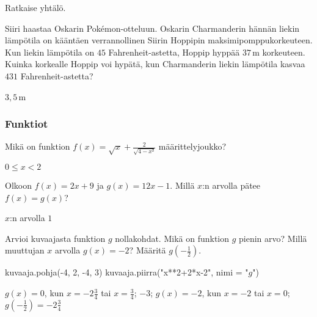 \begin{tehtava}
	Ratkaise yhtälö.
	
\begin{vastaus}
\end{vastaus}
\end{tehtava}

\begin{tehtava}
	Siiri haastaa Oskarin Pokémon-otteluun. Oskarin Charmanderin hännän liekin lämpötila on kääntäen verrannollinen Siirin Hoppipin maksimipomppukorkeuteen. Kun liekin lämpötila on $45$ Fahrenheit-astetta, Hoppip hyppää $37$\,m korkeuteen. Kuinka korkealle Hoppip voi hypätä, kun Charmanderin liekin lämpötila kasvaa $431$ Fahrenheit-astetta? %
	

\begin{vastaus}
	$3,5$\,m
\end{vastaus}
\end{tehtava}

\subsubsection*{Funktiot}

\begin{tehtava}
	Mikä on funktion $f(x)=\sqrt{x}+\frac{2}{\sqrt{4-x²}}$ määrittelyjoukko?
\begin{vastaus}
	{$0\leq x<2$}
		
\end{vastaus}
\end{tehtava}

\begin{tehtava}
	Olkoon $f(x)=2x+9$ ja $g(x)=12x-1$. Millä $x$:n arvolla pätee $f(x)=g(x)$? 

\begin{vastaus}
$x$:n arvolla $1$
		
\end{vastaus}
\end{tehtava}

\begin{tehtava}
Arvioi kuvaajasta funktion $g$ nollakohdat. Mikä on funktion $g$ pienin arvo? Millä muuttujan $x$ arvolla $g(x)=-2$? Määritä $g\left(-\frac{1}{2}\right)$.
\begin{kuva}
    kuvaaja.pohja(-4, 2, -4, 3)
    kuvaaja.piirra("x**2+2*x-2", nimi = "$g$")
\end{kuva}

\begin{vastaus}
	$g(x)=0$, kun $x=-2\frac{3}{4}$ tai $x=\frac{3}{4}$; $-3$; $g(x)=-2$, kun $x=-2$ tai $x=0$; $g\left(-\frac{1}{2}\right)=-2\frac{3}{4}$
		
\end{vastaus}
\end{tehtava}

